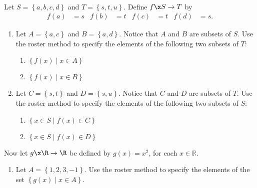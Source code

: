 \begin{previewactivity} \label{PA:functionsandsets} \hfill \\
Let $S = \left\{ a, b, c, d \right\}$ and $T = \left\{ s, t, u \right\}$.  Define $f\x S \to T$ by
\begin{align*}
f(a) &= s &  f(b) &= t &  f(c) &= t &  f(d) &= s. 
\end{align*}


\begin{enumerate}
\item Let $A = \left\{ a,c \right\}$ and $B = \left\{ a, d \right\}$.  Notice that $A$ and $B$ are subsets of $S$.  Use the roster method to specify the elements of the following two subsets of $T$: 
\begin{multicols}{2}
\begin{enumerate}
\item $\left\{ f ( x ) \mid x \in A \right\}$  
\item $\left\{ f ( x ) \mid x \in B \right\}$
\end{enumerate}
\end{multicols}

\item Let $C = \left\{ s, t \right\}$ and $D = \left\{ s, u \right\}$.  Notice that $C$ and $D$ are subsets of $T$. Use the roster method to specify the elements of the following two subsets of $S$:
\begin{multicols}{2}
\begin{enumerate}
\item $\left\{ x \in S \mid f ( x ) \in C \right\}$
\item $\left\{ x \in S \mid f ( x ) \in D \right\}$
\end{enumerate}
\end{multicols}
\end{enumerate}

\noindent
Now let $g\x  \R \to \R$ be defined by $g ( x ) = x^2$, for each $x \in \mathbb{R}$.

\setcounter{oldenumi}{\theenumi}
\begin{enumerate} \setcounter{enumi}{\theoldenumi}

\item Let $A = \left\{ 1, 2, 3, -1 \right\}$.  Use the roster method to specify the elements of the set 
$\left\{ g ( x ) \mid x \in A \right\}$.


\end{enumerate}
\end{previewactivity}
